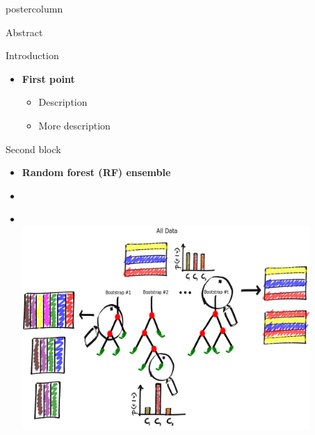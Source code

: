 \documentclass[final]{beamer}
\begin{document}
\begin{frame}
\begin{columns}
\begin{column}{.33\textwidth}
\begin{beamercolorbox}[center,wd=\textwidth]{postercolumn}
\begin{minipage}[T]{.95\textwidth}
{            %
            \begin{block}{Abstract}
              \lipsum[1-2]
            \end{block}
            \begin{block}{Introduction}
              \begin{itemize}
               \item \textbf{\color{titlescolor} First point }
               \begin{itemize}
               		\item Description 
               		\item More description
               \end{itemize}  
              \end{itemize}                 
            \end{block}
            \begin{block}{Second block}
            \begin{itemize}
            	\item \textbf{\color{titlescolor}Random forest (RF) ensemble}
            	\item []
            	\item []
            	\begin{columns}
            		\begin{column}{.54\textwidth}
            		\\
            			\includegraphics[width = 0.9\textwidth, height = 0.15\textheight]{images/framework/RF_train.png}
            		\end{column}
            		\begin{column}{.44\textwidth}

\end{column}
\end{columns}
\end{itemize}
\end{block}}
\end{minipage}
\end{beamercolorbox}
\end{column}
\end{columns}
\end{frame}
\end{document}
